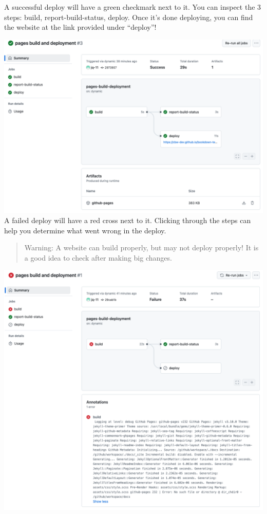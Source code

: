 \documentclass[
]{book}
\theoremstyle{definition}
\theoremstyle{definition}
\theoremstyle{definition}
\theoremstyle{definition}
\theoremstyle{remark}
\begin{document}
A successful deploy will have a green checkmark next to it. You can inspect the 3 steps: build, report-build-status, deploy. Once it's done deploying, you can find the website at the link provided under ``deploy''!

\includegraphics{img/git-instruct/successful-deploy.png}\\

A failed deploy will have a red cross next to it. Clicking through the steps can help you determine what went wrong in the deploy.

\begin{quote}
Warning: A website can build properly, but may not deploy properly! It is a good idea to check after making big changes.
\end{quote}

\includegraphics{img/git-instruct/failed-deploy.png}\\
\end{document}
